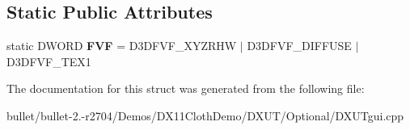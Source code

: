 \subsection*{Static Public Attributes}
\begin{DoxyCompactItemize}
\item 
\hypertarget{struct_d_x_u_t___s_c_r_e_e_n___v_e_r_t_e_x_a780008d5b7035a09a3422e0407c701a7}{static D\+W\+O\+R\+D {\bfseries F\+V\+F} = D3\+D\+F\+V\+F\+\_\+\+X\+Y\+Z\+R\+H\+W $\vert$ D3\+D\+F\+V\+F\+\_\+\+D\+I\+F\+F\+U\+S\+E $\vert$ D3\+D\+F\+V\+F\+\_\+\+T\+E\+X1}\label{struct_d_x_u_t___s_c_r_e_e_n___v_e_r_t_e_x_a780008d5b7035a09a3422e0407c701a7}

\end{DoxyCompactItemize}


The documentation for this struct was generated from the following file\+:\begin{DoxyCompactItemize}
\item 
bullet/bullet-\/2.-\/r2704/\+Demos/\+D\+X11\+Cloth\+Demo/\+D\+X\+U\+T/\+Optional/D\+X\+U\+Tgui.\+cpp\end{DoxyCompactItemize}
